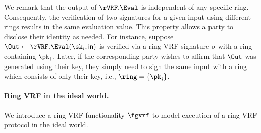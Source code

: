 We remark that the output of $\rVRF.\Eval$ is independent of any specific ring.  Consequently, the verification of two signatures for a given input using different rings results in the same evaluation value.  This property allows a party to disclose their identity as needed.  For instance, suppose $\Out \leftarrow \rVRF.\Eval(\sk_i, \msg)$ is verified via a ring VRF signature $\sigma$ with a ring containing $\pk_i$.  Later, if the corresponding party wishes to affirm that $\Out$ was generated using their key, they simply need to sign the same input with a ring which consists of only their key, i.e., $ \ring = \{\pk_i\} $.







\paragraph{Ring VRF in the ideal world.} We introduce a ring VRF functionality $ \fgvrf $ to model execution of a ring VRF protocol in the ideal world. 


